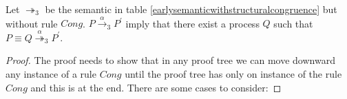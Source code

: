 \begin{lemma}\label{moveCongDowPi}
  Let $\twoheadrightarrow_{3}$ be the semantic in table \ref{earlysemanticwithstructuralcongruence} but without rule $Cong$. $P\xrightarrow{\alpha}_{3}P^{'}$ imply that there exist a process $Q$ such that $P\equiv Q \stackrel{\alpha}{\twoheadrightarrow}_{3} P^{'}$.
  \begin{proof}
    The proof needs to show that in any proof tree we can move downward any instance of a rule $Cong$ until the proof tree has only on instance of the rule $Cong$ and this is at the end. There are some cases to consider:
\end{proof}
\end{lemma}
